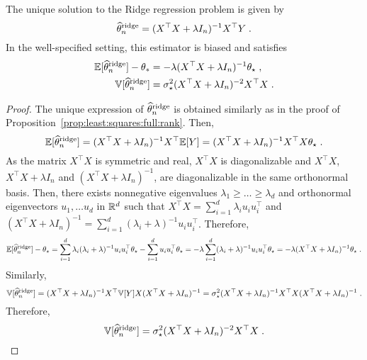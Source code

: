 \begin{shaded}
\begin{proposition}
\label{prop:least:squares:ridge}
The unique solution to the Ridge regression problem is given by
\[
\widehat {\theta}^{\mathrm{ridge}}_n = (X^\top X + \lambda I_n)^{-1}X^\top Y\;.
\] 
In the well-specified setting, this estimator is biased and satisfies 
\begin{align*}
\mathbb{E}[\widehat {\theta}^{\mathrm{ridge}}_n ] - \theta_*&= - \lambda(X^\top X + \lambda I_n)^{-1}\theta_\star\;,\\
\mathbb{V}[\widehat {\theta}^{\mathrm{ridge}}_n ] &= \sigma_\star^2(X^\top X + \lambda I_n)^{-2}X^\top X \;.
\end{align*}
\end{proposition}
\end{shaded}
\begin{proof}
The unique expression of $\widehat {\theta}^{\mathrm{ridge}}_n $ is obtained similarly as in the proof of Proposition~\ref{prop:least:squares:full:rank}. Then,
$$
\mathbb{E}[\widehat {\theta}^{\mathrm{ridge}}_n] =  (X^\top X + \lambda I_n)^{-1}X^\top \mathbb{E}[Y] =  (X^\top X + \lambda I_n)^{-1}X^\top X\theta_\star \;.
$$
As the matrix $X^\top X$ is symmetric and real,  $X^\top X$ is diagonalizable and $X^\top X$, $X^\top X + \lambda I_n$ and $(X^\top X + \lambda I_n)^{-1}$, are diagonalizable in the same orthonormal basis. Then, there exists nonnegative eigenvalues $\lambda_1\geqslant \ldots \geqslant \lambda_d$ and orthonormal eigenvectors $u_1, \ldots u_d$ in $\mathbb{R}^d$ such that $X^\top X = \sum_{i=1}^d \lambda_i u_i u_i^\top$ and $(X^\top X + \lambda I_n)^{-1} = \sum_{i=1}^d (\lambda_i + \lambda)^{-1}u_i u_i^\top$. Therefore, 
$$
\mathbb{E}[\widehat {\theta}^{\mathrm{ridge}}_n] -\theta_\star=  \sum_{i=1}^d \lambda_i(\lambda_i + \lambda)^{-1}u_i u_i^\top\theta_\star -  \sum_{i=1}^d u_i u_i^\top\theta_\star =  - \lambda  \sum_{i=1}^d (\lambda_i + \lambda)^{-1}u_i u_i^\top\theta_\star = - \lambda(X^\top X + \lambda I_n)^{-1}\theta_\star\;.
$$
Similarly,
$$
\mathbb{V}[\widehat {\theta}^{\mathrm{ridge}}_n]  =  (X^\top X + \lambda I_n)^{-1}X^\top \mathbb{V}[Y]X  (X^\top X + \lambda I_n)^{-1} = \sigma_\star^{2}(X^\top X + \lambda I_n)^{-1}X^\top X  (X^\top X + \lambda I_n)^{-1}\;.
$$
Therefore,
$$
\mathbb{V}[\widehat {\theta}^{\mathrm{ridge}}_n]  =   \sigma_\star^{2}(X^\top X + \lambda I_n)^{-2}X^\top X\;.
$$
\end{proof}


